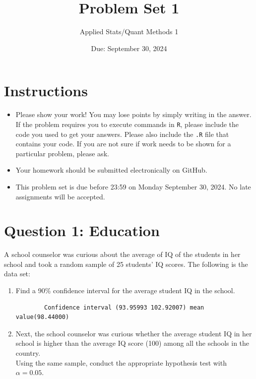 \documentclass[12pt,letterpaper]{article}
\title{Problem Set 1}
\date{Due: September 30, 2024}
\author{Applied Stats/Quant Methods 1}
\begin{document}
	\maketitle
	
	\section*{Instructions}
	\begin{itemize}
	\item Please show your work! You may lose points by simply writing in the answer. If the problem requires you to execute commands in \texttt{R}, please include the code you used to get your answers. Please also include the \texttt{.R} file that contains your code. If you are not sure if work needs to be shown for a particular problem, please ask.
\item Your homework should be submitted electronically on GitHub.
\item This problem set is due before 23:59 on Monday September 30, 2024. No late assignments will be accepted.
	\end{itemize}
	
	\vspace{1cm}
	\section*{Question 1: Education}

A school counselor was curious about the average of IQ of the students in her school and took a random sample of 25 students' IQ scores. The following is the data set:\\
\vspace{.5cm}

  

\vspace{1cm}

\begin{enumerate}
	\item Find a 90\% confidence interval for the average student IQ in the school.\\
	
	\begin{verbatim}
		Confidence interval (93.95993 102.92007) mean value(98.44000)
	\end{verbatim} 
	\item Next, the school counselor was curious  whether  the average student IQ in her school is higher than the average IQ score (100) among all the schools in the country.\\ 
	\noindent Using the same sample, conduct the appropriate hypothesis test with $\alpha=0.05$.

	  
\end{enumerate}
\end{document}
